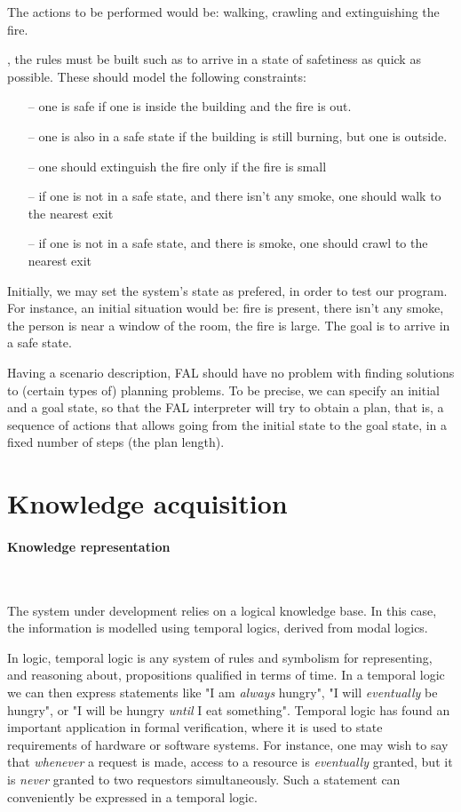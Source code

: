 \documentclass[a4paper,12pt]{report}
\begin{document}
 The actions to be performed would be: walking, crawling and extinguishing the fire.

{\color{blue}{\it Thirdly}}, the rules must be built such as to arrive in a state of safetiness as quick as possible. 
These should model the following constraints:
\begin{itemize}
\item[--] one is safe if one is inside the building and the fire is out.
\item[--] one is also in a safe state if the building is still burning, but one is outside.

\item[--] one should extinguish the fire only if the fire is small
\item[--] if one is not in a safe state, and there isn't any smoke, one should walk to the nearest exit
\item[--] if one is not in a safe state, and there is smoke, one should crawl to the nearest exit
\end{itemize}

Initially, we may set the system's state as prefered, in order to test our program. 
For instance, an initial situation would be: fire is present, there isn't any smoke, the person is near a window of the room, the fire is large.
The goal is to arrive in a safe state.


Having a scenario description,  FAL should have no problem with finding solutions to (certain types of) planning problems.
To be precise, we can specify an initial and a goal state, so that the FAL interpreter will try to obtain a plan, that is, a sequence of actions that allows going from the initial state to the goal state, in a fixed number of steps (the plan length). 


\section{Knowledge acquisition}

\paragraph{Knowledge representation} $ $ 

The system under development relies on a logical knowledge base. In this case, the information is modelled using temporal logics, derived from modal logics.

In logic, temporal logic is any system of rules and symbolism for representing, and reasoning about, propositions qualified in terms of time. 
In a temporal logic we can then express statements like "I am {\it always} hungry", "I will {\it eventually} be hungry", or "I will be hungry {\it until} I eat something". 
Temporal logic has found an important application in formal verification, where it is used to state requirements of hardware or software systems. 
For instance, one may wish to say that {\it whenever} a request is made, access to a resource is {\it eventually} granted, but it is {\it never} granted to two requestors simultaneously. 
Such a statement can conveniently be expressed in a temporal logic.
\end{document}
